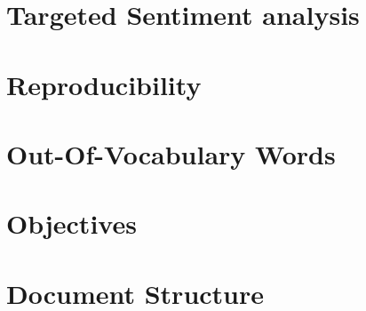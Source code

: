 \documentclass[../../fyp.tex]{subfiles}
\begin{document}


\section{Targeted Sentiment analysis} 

\section{Reproducibility} 

\section{Out-Of-Vocabulary Words} 

\section{Objectives} \label{sec:objectives}

\section{Document Structure}

\end{document}
